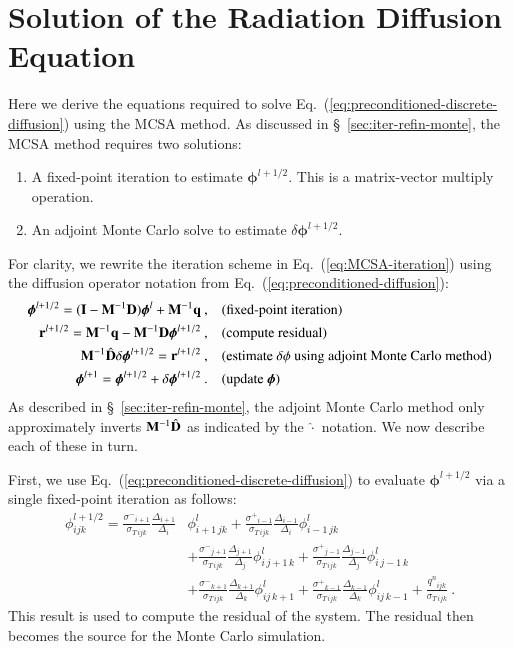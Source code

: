 \documentclass[preprint,12pt]{elsarticle}
\newcommand{\vr}{\ensuremath{\ve{r}}}
\newcommand{\vI}{\ensuremath{\ve{I}}}
\newcommand{\qn}{\ensuremath{q^n}} \newcommand{\Tn}{\ensuremath{T^n}}
\newcommand{\Di}{\ensuremath{\Delta_i}}
\newcommand{\Dj}{\ensuremath{\Delta_j}}
\newcommand{\Dk}{\ensuremath{\Delta_k}}
\newcommand{\sigT}{\ensuremath{\sigma_{T\,ijk}}}
\newcommand{\sigm}{\ensuremath{\sigma^{-}}}
\newcommand{\sigp}{\ensuremath{\sigma^{+}}}
\newcommand{\bphi}{\ensuremath{\boldsymbol{\phi}}}
\begin{document}
\section{Solution of the Radiation Diffusion Equation}
\label{sec:solut-radi-diff}

Here we derive the equations required to solve
Eq.~(\ref{eq:preconditioned-discrete-diffusion}) using the MCSA method.  As
discussed in \S~\ref{sec:iter-refin-monte}, the MCSA method requires two
solutions:
\begin{enumerate}
\item A fixed-point iteration to estimate $\bphi^{l+1/2}$.  This is a
  matrix-vector multiply operation.
\item An adjoint Monte Carlo solve to estimate $\delta\bphi^{l+1/2}$.
\end{enumerate}
For clarity, we rewrite the iteration scheme in Eq.~(\ref{eq:MCSA-iteration})
using the diffusion operator notation from
Eq.~(\ref{eq:preconditioned-diffusion}):
\begin{align*}
   \bphi^{l+1/2} = (\vI - \ve{M}^{-1}\ve{D})\bphi^{l} +
  \ve{M}^{-1}\ve{q}\:, \quad & (\text{fixed-point iteration})\\
  \vr^{l+1/2} = \ve{M}^{-1}\ve{q} - \ve{M}^{-1}\ve{D}\bphi^{l+1/2}\:,
  \quad & (\text{compute residual})\\ 
  \ve{M}^{-1}\hat{\ve{D}}\delta\bphi^{l+1/2} = \vr^{l+1/2}\:, \quad&
  (\text{estimate $\delta\phi$ using adjoint Monte Carlo method})\\
  \bphi^{l+1} = \bphi^{l+1/2} + \delta\bphi^{l+1/2}\:. \quad&
  (\text{update}\ \bphi)
\end{align*}
As described in \S~\ref{sec:iter-refin-monte}, the adjoint Monte Carlo method
only approximately inverts $\mathbf{M}^{-1}\hat{\mathbf{D}}$ as indicated by the
$\hat{\cdot}$ notation.  We now describe each of these in turn.

First, we use Eq.~(\ref{eq:preconditioned-discrete-diffusion}) to evaluate
$\bphi^{l+1/2}$ via a single fixed-point iteration as follows:
\begin{equation}
  \begin{aligned}
    \phi_{ijk}^{l+1/2} =
    \frac{\sigm_{i+1}}{\sigT}\frac{\Delta_{i+1}}{\Di}&\phi_{i+1\,jk}^l
    +
    \frac{\sigp_{i-1}}{\sigT}\frac{\Delta_{i-1}}{\Di}\phi_{i-1\,jk}^l
    \\ &+
    \frac{\sigm_{j+1}}{\sigT}\frac{\Delta_{j+1}}{\Dj}\phi_{i\,j+1\,k}^l
    +
    \frac{\sigp_{j-1}}{\sigT}\frac{\Delta_{j-1}}{\Dj}\phi_{i\,j-1\,k}^l
    \\ &+
    \frac{\sigm_{k+1}}{\sigT}\frac{\Delta_{k+1}}{\Dk}\phi_{ij\,k+1}^l
    +
    \frac{\sigp_{k-1}}{\sigT}\frac{\Delta_{k-1}}{\Dk}\phi_{ij\,k-1}^l
    + \frac{\qn_{ijk}}{\sigT}\:.
  \end{aligned}
\end{equation}
This result is used to compute the residual of the system.  The residual then
becomes the source for the Monte Carlo simulation.
\end{document}
